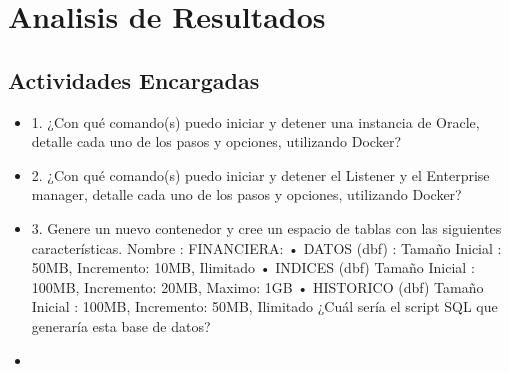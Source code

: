 \section{Analisis  de Resultados} 


\subsection{Actividades Encargadas}
	\begin{itemize}
		\item 1. ¿Con qué comando(s) puedo iniciar y detener una instancia de Oracle, detalle cada uno de los pasos y opciones,
		utilizando Docker?
		
		\item2. ¿Con qué comando(s) puedo iniciar y detener el Listener y el Enterprise manager, detalle cada uno de los pasos y
		opciones, utilizando Docker?
		\item 3. Genere un nuevo contenedor y cree un espacio de tablas con las siguientes características.
		Nombre : FINANCIERA:
		• DATOS (dbf) : Tamaño Inicial : 50MB, Incremento: 10MB, Ilimitado
		• INDICES (dbf) Tamaño Inicial : 100MB, Incremento: 20MB, Maximo: 1GB
		• HISTORICO (dbf) Tamaño Inicial : 100MB, Incremento: 50MB, Ilimitado
		¿Cuál sería el script SQL que generaría esta base de datos?
		\item
	\end{itemize}








